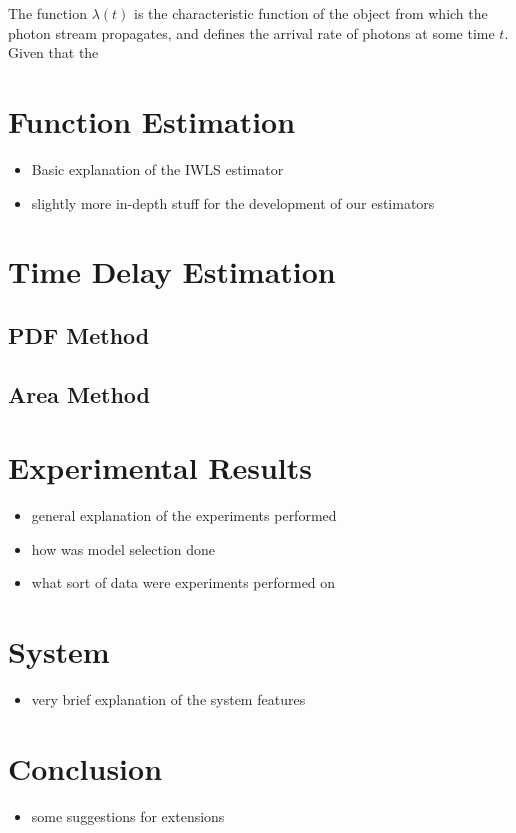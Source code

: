 \documentclass[a4paper,11pt]{article}
\begin{document}
\begin{comment}
  \begin{algorithm}[H]
    \begin{algorithmic}[1]
      \REQUIRE $\lambda\geq \lambda(t), 0 \leq t \leq T$
      \STATE $\Phi=\emptyset$, $t=0$, $T=\text{interval length}$
      \WHILE{$t<T$}
      \STATE Generate $U_1\sim U(0,1)$
      \STATE $\phi_n=t-\frac{1}{\lambda}\ln(U_1)$
      \STATE Generate $U_2\sim U(0,1)$, independent of $U_1$
      \IF{$U_2\leq\frac{\lambda(t)}{\lambda}$}
      \STATE $\Phi \leftarrow \phi_n$
      \ENDIF
      \ENDWHILE
      \RETURN $\Phi$
    \end{algorithmic}
    \caption{Simulating T Time Units of a NHPP by Thinning}
    \label{alg:seq}
  \end{algorithm}
\end{comment}
The function $\lambda(t)$ is the characteristic function of the object
from which the photon stream propagates, and defines the arrival rate of photons
at some time $t$. Given that the
\section{Function Estimation}
\label{sec-4}

\begin{itemize}
\item Basic explanation of the IWLS estimator
\item slightly more in-depth stuff for the development of our estimators
\end{itemize}
\section{Time Delay Estimation}
\label{sec-5}
\subsection{PDF Method}
\label{sec-5-1}
\subsection{Area Method}
\label{sec-5-2}
\section{Experimental Results}
\label{sec-6}

\begin{itemize}
\item general explanation of the experiments performed
\item how was model selection done
\item what sort of data were experiments performed on
\end{itemize}
\section{System}
\label{sec-7}

\begin{itemize}
\item very brief explanation of the system features
\end{itemize}
\section{Conclusion}
\label{sec-8}

\begin{itemize}
\item some suggestions for extensions
\end{itemize}
\end{document}
